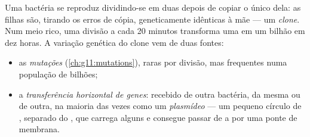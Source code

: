 \begin{proposition}\label{prop:g11:antibiotic-resistance:variation}
Uma bactéria se reproduz dividindo-se em duas depois de copiar o
 único dela: as filhas são, tirando os erros de cópia,
geneticamente idênticas à mãe --- um \emph{clone}. Num meio rico, uma
divisão a cada 20 minutos transforma uma  em um bilhão em dez
horas. A variação genética do clone vem de duas fontes:
\begin{itemize}
  \item as \emph{mutações} (\cref{ch:g11:mutations}), raras por
        divisão, mas frequentes numa população de bilhões;
  \item a \emph{transferência horizontal de genes}:
         recebido de outra bactéria, da mesma  ou de outra,
        na maioria das vezes como um \emph{plasmídeo} --- um pequeno
        círculo de , separado do , que carrega alguns
         e consegue passar de  a  por uma ponte de
        membrana.
\end{itemize}
\end{proposition}
\admitted


